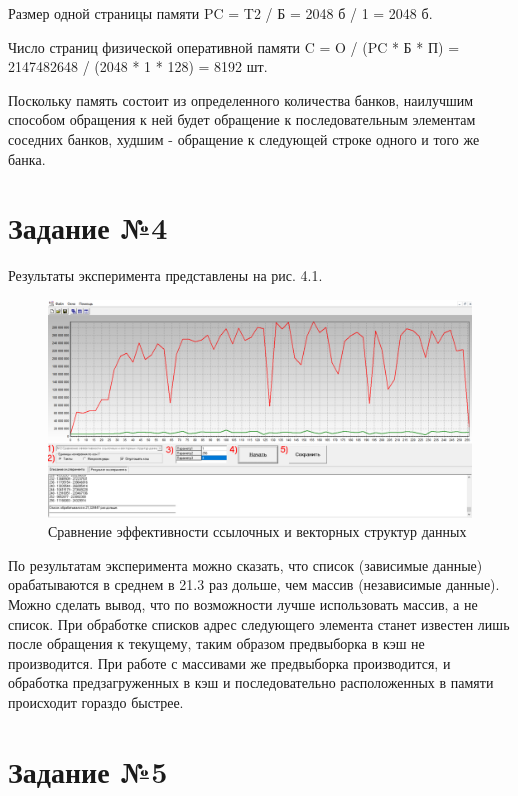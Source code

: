 Размер одной страницы памяти PC = T2 / Б = 2048 б / 1 = 2048 б.

Число страниц физической оперативной памяти C = O / (PC * Б * П) = 2147482648 / (2048 * 1 * 128) = 8192 шт.

Поскольку память состоит из определенного количества банков, наилучшим способом обращения к ней будет обращение к последовательным элементам соседних банков, худшим - обращение к следующей строке одного и того же банка.

\chapter{Задание №4}

Результаты эксперимента представлены на рис. 4.1.

\begin{figure}[H]
	\begin{center}
		\includegraphics[scale=0.5]{assets/task4.png}
	\end{center}
	\caption{Сравнение эффективности ссылочных и векторных структур данных}
\end{figure}

По результатам эксперимента можно сказать, что список (зависимые данные) орабатываются в среднем в 21.3 раз дольше, чем массив (независимые данные). Можно сделать вывод, что по возможности лучше использовать массив, а не список. При обработке списков адрес следующего элемента станет известен лишь после обращения к текущему, таким образом предвыборка в кэш не производится. При работе с массивами же предвыборка производится, и обработка предзагруженных в кэш и последовательно расположенных в памяти происходит гораздо быстрее.

\chapter{Задание №5}

